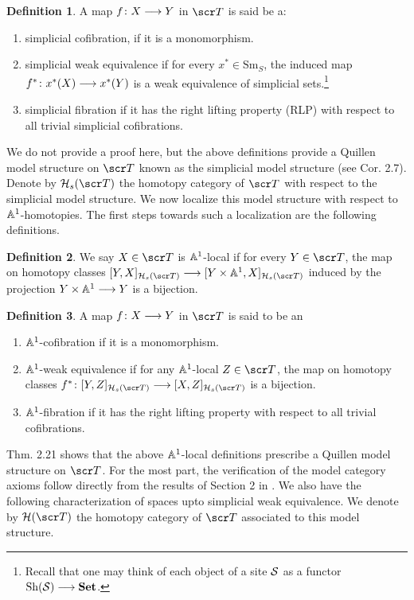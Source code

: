 \documentclass{amsart}
\theoremstyle{definition}
\newtheorem{defn}{Definition}[section]
\begin{document}
\begin{defn}
A map $f \colon X \longrightarrow Y$ in $\sT$ is said be a:
\begin{enumerate}
\item simplicial cofibration, if it is a monomorphism.
\item simplicial weak equivalence if for every $x^* \in \mathrm{Sm}_S$, the induced map $f^* \colon x^*(X) \longrightarrow x^*(Y)$ is a weak equivalence of simplicial sets.\footnote{Recall that one may think of each object of a site ${\mathcal{S}}$ as a functor $\mathrm{Sh}({\mathcal{S}}) \longrightarrow \mathbf{Set}$.}
\item simplicial fibration if it has the right lifting property (RLP) with respect to all trivial simplicial cofibrations.
\end{enumerate}
\end{defn}

We do not provide a proof here, but the above definitions provide a Quillen model structure on $\sT$ known as the simplicial model structure (see \cite{Jardine87simppr} Cor. 2.7). Denote by $\oH_s(\sT)$ the homotopy category of $\sT$ with respect to the simplicial model structure. We now localize this model structure with respect to $\mathbb{A}^1$-homotopies. The first steps towards such a localization are the following definitions.

\begin{defn}
We say $X \in \sT$ is $\mathbb{A}^1$-local if for every $Y \in \sT$, the map on homotopy classes $[Y,X]_{\oH_s(\sT)} \rtarr [Y \times \bA^1, X]_{\oH_s(\sT)}$ induced by the projection $Y \times \mathbb{A}^1 \longrightarrow Y$ is a bijection.
\end{defn}

\begin{defn}
A map $f \colon X \longrightarrow Y$ in $\sT$ is said to be an
\begin{enumerate}
\item $\mathbb{A}^1$-cofibration if it is a monomorphism.
\item $\mathbb{A}^1$-weak equivalence if for any $\mathbb{A}^1$-local $Z \in \sT$, the map on homotopy classes $f^* \colon [Y,Z]_{\oH_s (\sT)} \rtarr [X,Z]_{\oH_s(\sT)}$ is a bijection.
\item $\mathbb{A}^1$-fibration if it has the right lifting property with respect to all trivial cofibrations.
\end{enumerate}
\end{defn}

\cite{MV99} Thm. 2.21 shows that the above $\mathbb{A}^1$-local definitions prescribe a Quillen model structure on $\sT$. For the most part, the verification of the model category axioms follow directly from the results of Section 2 in \cite{Jardine87simppr}. We also have the following characterization of spaces upto simplicial weak equivalence. We denote by $\oH (\sT)$ the homotopy category of $\sT$ associated to this model structure.
\end{document}
